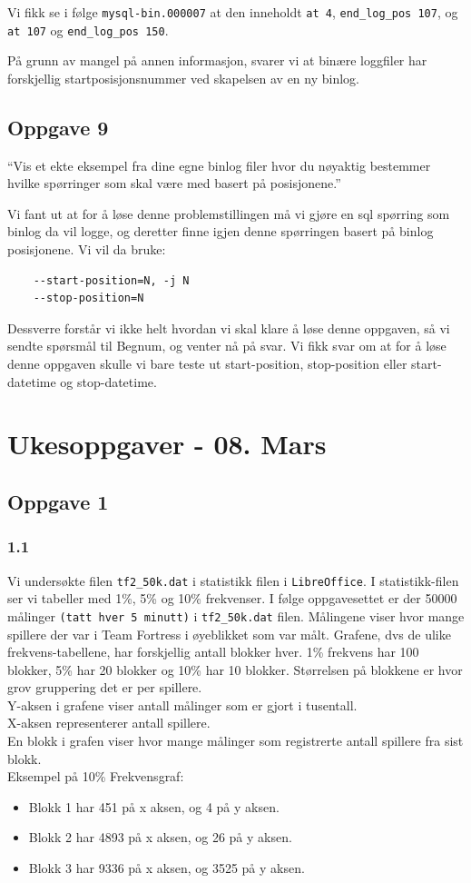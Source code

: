 \documentclass[a4paper, norsk, 12pt]{article}
\begin{document}
Vi fikk se i følge \verb|mysql-bin.000007| at den inneholdt \verb|at 4|, \verb|end_log_pos 107|, og \verb|at 107| og \verb|end_log_pos 150|.


På grunn av mangel på annen informasjon, svarer vi at binære loggfiler har forskjellig startposisjonsnummer ved skapelsen av en ny binlog.
\subsection{Oppgave 9}
“Vis et ekte eksempel fra dine egne binlog filer hvor du nøyaktig bestemmer hvilke spørringer som skal være med basert på posisjonene.”

Vi fant ut at for å løse denne problemstillingen må vi gjøre en sql spørring som binlog da vil logge, og deretter finne igjen denne spørringen basert på binlog posisjonene. Vi vil da bruke:
\begin{verbatim}
    --start-position=N, -j N
    --stop-position=N
\end{verbatim}

Dessverre forstår vi ikke helt hvordan vi skal klare å løse denne oppgaven, så vi sendte spørsmål til Begnum, og venter nå på svar. Vi fikk svar om at for å løse denne oppgaven skulle vi bare teste ut start-position, stop-position eller start-datetime og stop-datetime.

\section{Ukesoppgaver - 08. Mars}
\subsection{Oppgave 1}
\subsubsection*{1.1}
Vi undersøkte filen \verb|tf2_50k.dat| i statistikk filen i \verb|LibreOffice|. I statistikk-filen ser vi tabeller med 1\%, 5\% og 10\% frekvenser. I følge oppgavesettet er der 50000 målinger \verb|(tatt hver 5 minutt)| i \verb|tf2_50k.dat| filen.  Målingene viser hvor mange spillere der var i Team Fortress i øyeblikket som var målt. Grafene, dvs de ulike frekvens-tabellene, har forskjellig antall blokker hver. 1\% frekvens har 100 blokker, 5\% har 20 blokker og 10\% har 10 blokker. Størrelsen på blokkene er hvor grov gruppering det er per spillere.\\

Y-aksen i grafene viser antall målinger som er gjort i tusentall.\\
X-aksen representerer antall spillere.\\
En blokk i grafen viser hvor mange målinger som registrerte antall spillere fra sist blokk.\\
Eksempel på 10\% Frekvensgraf:
\begin{itemize}
\item Blokk 1 har   451 på x aksen, og   4 på y aksen.
\item Blokk 2 har 4893 på x aksen, og 26 på y aksen.
\item Blokk 3 har 9336 på x aksen, og 3525 på y aksen.
\end{itemize}
\end{document}
